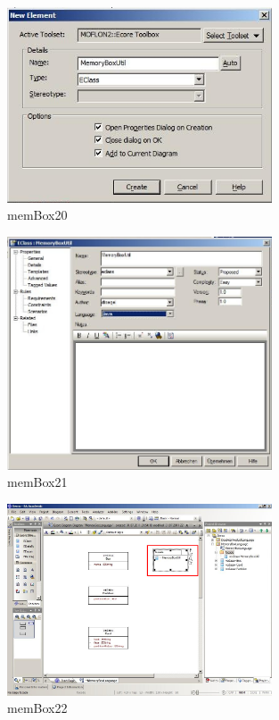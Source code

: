 \begin{figure}[htbp]
	\centering
  \includegraphics[width=0.7\textwidth]{pics/memBox20.png}
	\caption{memBox20}
	\label{memBox20}
\end{figure}

\begin{figure}[htbp]
	\centering
  \includegraphics[width=0.7\textwidth]{pics/memBox21.png}
	\caption{memBox21}
	\label{memBox21}
\end{figure}

\begin{figure}[htbp]
	\centering
  \includegraphics[width=0.7\textwidth]{pics/memBox22.png}
	\caption{memBox22}
	\label{memBox22}
\end{figure}

